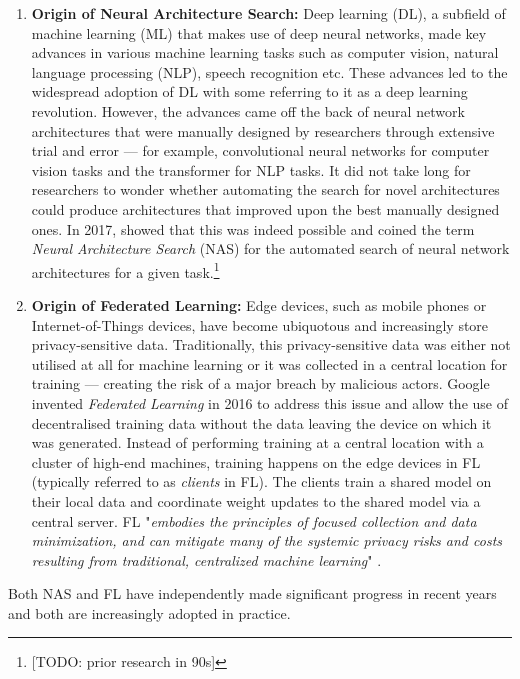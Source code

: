 \begin{enumerate}
    \item \textbf{Origin of Neural Architecture Search:} Deep learning (DL), a subfield of machine learning (ML) that makes use of deep neural networks, made key advances in various machine learning tasks such as computer vision, natural language processing (NLP), speech recognition etc. These advances led to the widespread adoption of DL with some referring to it as a deep learning revolution. However, the advances came off the back of neural network architectures that were manually designed by researchers through extensive trial and error — for example, convolutional neural networks for computer vision tasks and the transformer for NLP tasks. It did not take long for researchers to wonder whether automating the search for novel architectures could produce architectures that improved upon the best manually designed ones. In 2017, \cite{nas_with_rl_2017} showed that this was indeed possible and coined the term \textit{Neural Architecture Search} (NAS) for the automated search of neural network architectures for a given task.\footnote{[TODO: prior research in 90s]}
    \item \textbf{Origin of Federated Learning:} Edge devices, such as mobile phones or Internet-of-Things devices, have become ubiquotous and increasingly store privacy-sensitive data. Traditionally, this privacy-sensitive data was either not utilised at all for machine learning or it was collected in a central location for training — creating the risk of a major breach by malicious actors. Google invented \textit{Federated Learning} in 2016 to address this issue and allow the use of decentralised training data without the data leaving the device on which it was generated. Instead of performing training at a central location with a cluster of high-end machines, training happens on the edge devices in FL (typically referred to as \textit{clients} in FL). The clients train a shared model on their local data and coordinate weight updates to the shared model via a central server. FL "\textit{embodies the principles of focused collection and data minimization, and can mitigate many of the systemic privacy risks and costs resulting from traditional, centralized machine learning}" \cite{fl_advances_and_open_problems_2021}.
\end{enumerate}

Both NAS and FL have independently made significant progress in recent years and both are increasingly adopted in practice.

